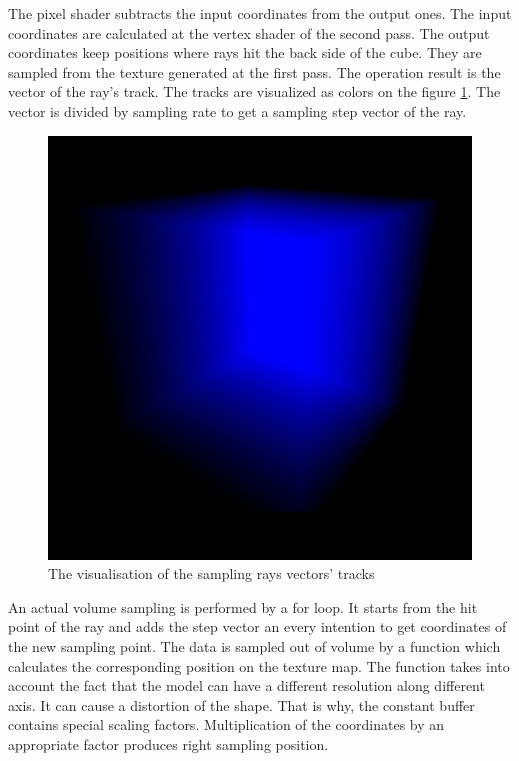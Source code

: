\documentclass[twoside, english, 11pt]{report}
\begin{document}
The pixel shader subtracts the input coordinates from the output ones. The input coordinates are calculated at the vertex shader of the second pass. The output coordinates keep positions where rays hit the back side of the cube. They are sampled from the texture generated at the first pass. The operation result is the vector of the ray's track. The tracks are visualized as colors on the figure \ref{fig:final}. The vector is divided by sampling rate to get a sampling step vector of the ray.
\begin{figure}[!h]
\centerline{\includegraphics[scale = 0.3]{img/final}}
\caption{The visualisation of the sampling rays vectors' tracks \label{fig:final}}
\end{figure}
An actual volume sampling is performed by a for loop. It starts from the hit point of the ray and adds the step vector an every intention to get coordinates of the new sampling point. The data is sampled out of volume by a function which calculates the corresponding position on the texture map. The function takes into account the fact that the model can have a different resolution along different axis. It can cause a distortion of the shape. That is why, the constant buffer contains special scaling factors. Multiplication of the coordinates by an appropriate factor produces right sampling position.\\
\end{document}
